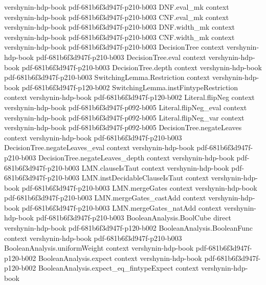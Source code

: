 \begin{theorem}
  {vershynin-hdp-book}
  {pdf-681b6f3d947f-p210-b003}
\proofstep
  {DNF.eval_mk}
  {context}
  {vershynin-hdp-book}
  {pdf-681b6f3d947f-p210-b003}
\proofstep
  {CNF.eval_mk}
  {context}
  {vershynin-hdp-book}
  {pdf-681b6f3d947f-p210-b003}
\proofstep
  {DNF.width_mk}
  {context}
  {vershynin-hdp-book}
  {pdf-681b6f3d947f-p210-b003}
\proofstep
  {CNF.width_mk}
  {context}
  {vershynin-hdp-book}
  {pdf-681b6f3d947f-p210-b003}
\proofstep
  {DecisionTree}
  {context}
  {vershynin-hdp-book}
  {pdf-681b6f3d947f-p210-b003}
\proofstep
  {DecisionTree.eval}
  {context}
  {vershynin-hdp-book}
  {pdf-681b6f3d947f-p210-b003}
\proofstep
  {DecisionTree.depth}
  {context}
  {vershynin-hdp-book}
  {pdf-681b6f3d947f-p210-b003}
\proofstep
  {SwitchingLemma.Restriction}
  {context}
  {vershynin-hdp-book}
  {pdf-681b6f3d947f-p120-b002}
\proofstep
  {SwitchingLemma.instFintypeRestriction}
  {context}
  {vershynin-hdp-book}
  {pdf-681b6f3d947f-p120-b002}
\proofstep
  {Literal.flipNeg}
  {context}
  {vershynin-hdp-book}
  {pdf-681b6f3d947f-p092-b005}
\proofstep
  {Literal.flipNeg_eval}
  {context}
  {vershynin-hdp-book}
  {pdf-681b6f3d947f-p092-b005}
\proofstep
  {Literal.flipNeg_var}
  {context}
  {vershynin-hdp-book}
  {pdf-681b6f3d947f-p092-b005}
\proofstep
  {DecisionTree.negateLeaves}
  {context}
  {vershynin-hdp-book}
  {pdf-681b6f3d947f-p210-b003}
\proofstep
  {DecisionTree.negateLeaves_eval}
  {context}
  {vershynin-hdp-book}
  {pdf-681b6f3d947f-p210-b003}
\proofstep
  {DecisionTree.negateLeaves_depth}
  {context}
  {vershynin-hdp-book}
  {pdf-681b6f3d947f-p210-b003}
\proofstep
  {LMN.clauseIsTaut}
  {context}
  {vershynin-hdp-book}
  {pdf-681b6f3d947f-p210-b003}
\proofstep
  {LMN.instDecidableClauseIsTaut}
  {context}
  {vershynin-hdp-book}
  {pdf-681b6f3d947f-p210-b003}
\proofstep
  {LMN.mergeGates}
  {context}
  {vershynin-hdp-book}
  {pdf-681b6f3d947f-p210-b003}
\proofstep
  {LMN.mergeGates_castAdd}
  {context}
  {vershynin-hdp-book}
  {pdf-681b6f3d947f-p210-b003}
\proofstep
  {LMN.mergeGates_natAdd}
  {context}
  {vershynin-hdp-book}
  {pdf-681b6f3d947f-p210-b003}
\proofstep
  {BooleanAnalysis.BoolCube}
  {direct}
  {vershynin-hdp-book}
  {pdf-681b6f3d947f-p120-b002}
\proofstep
  {BooleanAnalysis.BooleanFunc}
  {context}
  {vershynin-hdp-book}
  {pdf-681b6f3d947f-p210-b003}
\proofstep
  {BooleanAnalysis.uniformWeight}
  {context}
  {vershynin-hdp-book}
  {pdf-681b6f3d947f-p120-b002}
\proofstep
  {BooleanAnalysis.expect}
  {context}
  {vershynin-hdp-book}
  {pdf-681b6f3d947f-p120-b002}
\proofstep
  {BooleanAnalysis.expect_eq_fintypeExpect}
  {context}
  {vershynin-hdp-book}

\end{theorem}
